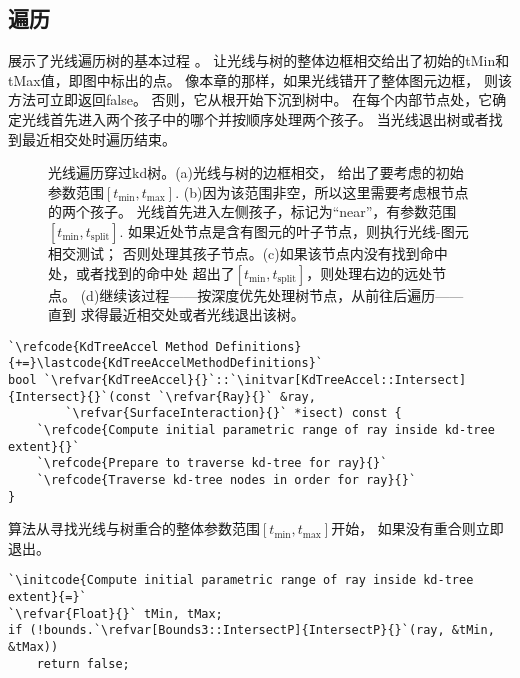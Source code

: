 \subsection{遍历}\label{sub:遍历2}
展示了光线遍历树的基本过程
。
让光线与树的整体边框相交给出了初始的{\ttfamily tMin}和{\ttfamily tMax}值，即图中标出的点。
像本章的那样，如果光线错开了整体图元边框，
则该方法可立即返回{\ttfamily false}。
否则，它从根开始下沉到树中。
在每个内部节点处，它确定光线首先进入两个孩子中的哪个并按顺序处理两个孩子。
当光线退出树或者找到最近相交处时遍历结束。
\begin{figure}[htbp]
    \centering
    \caption{光线遍历穿过kd树。(a)光线与树的边框相交，
    给出了要考虑的初始参数范围$[t_{\min},t_{\max}]$.
    (b)因为该范围非空，所以这里需要考虑根节点的两个孩子。
    光线首先进入左侧孩子，标记为“near”，有参数范围$[t_{\min},t_{\text{split}}]$.
    如果近处节点是含有图元的叶子节点，则执行光线-图元相交测试；
    否则处理其孩子节点。(c)如果该节点内没有找到命中处，或者找到的命中处
    超出了$[t_{\min},t_{\text{split}}]$，则处理右边的远处节点。
    (d)继续该过程——按深度优先处理树节点，从前往后遍历——直到
    求得最近相交处或者光线退出该树。}
    \label{fig:4.17}
\end{figure}
\begin{lstlisting}
`\refcode{KdTreeAccel Method Definitions}{+=}\lastcode{KdTreeAccelMethodDefinitions}`
bool `\refvar{KdTreeAccel}{}`::`\initvar[KdTreeAccel::Intersect]{Intersect}{}`(const `\refvar{Ray}{}` &ray,
        `\refvar{SurfaceInteraction}{}` *isect) const {
    `\refcode{Compute initial parametric range of ray inside kd-tree extent}{}`
    `\refcode{Prepare to traverse kd-tree for ray}{}`
    `\refcode{Traverse kd-tree nodes in order for ray}{}`
}
\end{lstlisting}

算法从寻找光线与树重合的整体参数范围$[t_{\min},t_{\max}]$开始，
如果没有重合则立即退出。
\begin{lstlisting}
`\initcode{Compute initial parametric range of ray inside kd-tree extent}{=}`
`\refvar{Float}{}` tMin, tMax;
if (!bounds.`\refvar[Bounds3::IntersectP]{IntersectP}{}`(ray, &tMin, &tMax)) 
    return false;
\end{lstlisting}

